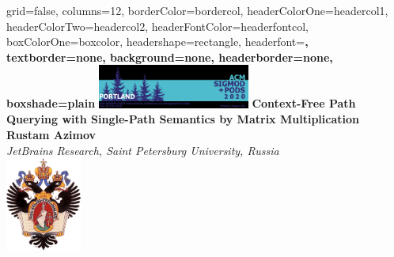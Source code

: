 \documentclass[a0paper,portrait]{baposter}
\begin{document}
\setlength{\fboxsep}{0pt}


\begin{poster}{
grid=false,
columns=12, %
borderColor=bordercol, %
headerColorOne=headercol1, %
headerColorTwo=headercol2, %
headerFontColor=headerfontcol, %
boxColorOne=boxcolor, %
headershape=rectangle, %
headerfont=\Large\sf\bf, %
textborder=none,
background=none,
headerborder=none, %
boxshade=plain
}
{\includegraphics[width=5cm]{Sigmod_logo.png}}
%
%
{\bf \huge{Context-Free Path Querying with Single-Path Semantics by Matrix Multiplication} }
{\vspace{0.6em} \smaller \textbf{Rustam Azimov} \\  %
\smaller \it {JetBrains Research, Saint Petersburg University, Russia } \\ %
}
{\includegraphics[width=2.5cm]{SPbGU_Logo.png}} %



\end{poster}
\end{document}
